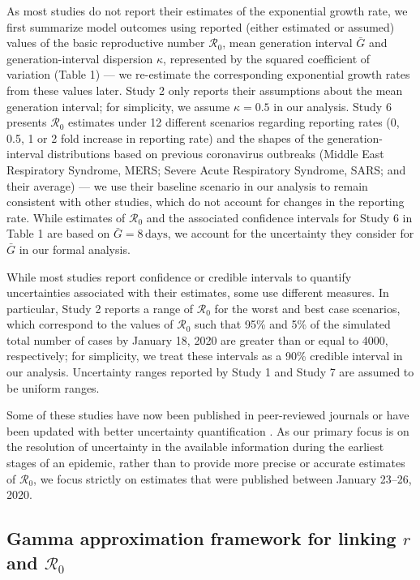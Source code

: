 \documentclass[12pt]{article}
\newcommand{\Ro}{\ensuremath{{\mathcal R}_{0}}\xspace}
\begin{document}
As most studies do not report their estimates of the exponential growth rate, we first summarize model outcomes using reported (either estimated or assumed) values of the basic reproductive number \Ro, mean generation interval $\bar G$ and generation-interval dispersion $\kappa$, represented by the squared coefficient of variation (Table 1) ---
we re-estimate the corresponding exponential growth rates from these values later.
Study 2 only reports their assumptions about the mean generation interval; for simplicity, we assume $\kappa = 0.5$ in our analysis.
Study 6 presents \Ro estimates under 12 different scenarios regarding reporting rates (0, 0.5, 1 or 2 fold increase in reporting rate) and the shapes of the generation-interval distributions based on previous coronavirus outbreaks (Middle East Respiratory Syndrome, MERS; Severe Acute Respiratory Syndrome, SARS; and their average) ---
we use their baseline scenario in our analysis to remain consistent with other studies, which do not account for changes in the reporting rate.
While estimates of \Ro and the associated confidence intervals for Study 6 in Table 1 are based on $\bar G = 8\,\mathrm{days}$, we account for the uncertainty they consider for $\bar G$ in our formal analysis.

While most studies report confidence or credible intervals to quantify uncertainties associated with their estimates, some use different measures.
In particular, Study 2 reports a range of \Ro for the worst and best case scenarios, which correspond to the values of \Ro such that 95\% and 5\% of the simulated total number of cases by January 18, 2020 are greater than or equal to 4000, respectively;
for simplicity, we treat these intervals as a 90\% credible interval in our analysis.
Uncertainty ranges reported by Study 1 and Study 7 are assumed to be uniform ranges.

Some of these studies have now been published in peer-reviewed journals \citep{riou2020pattern, zhao2020preliminary} or have been updated with better uncertainty quantification \citep{readncov2}.
As our primary focus is on the resolution of uncertainty in the available information during the earliest stages of an epidemic, rather than to provide more precise or accurate estimates of \Ro, we focus strictly on estimates that were published between January 23--26, 2020.

\subsection{Gamma approximation framework for linking $r$ and $\Ro$}
\end{document}
